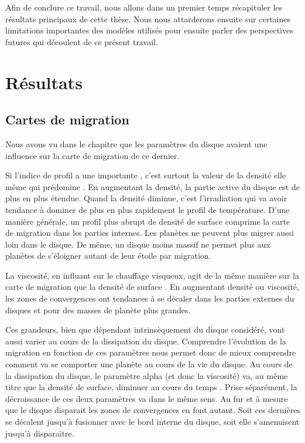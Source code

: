 Afin de conclure ce travail, nous allons dans un premier temps récapituler les résultats principaux de cette thèse. Nous nous attarderons ensuite sur certaines limitations importantes des modèles utilisés pour ensuite parler des perspectives futures qui découlent de ce présent travail. 

\section{Résultats}
\subsection{Cartes de migration}
Nous avons vu dans le chapitre  que les paramètres du disque avaient une influence sur la carte de migration de ce dernier. 

Si l'indice de profil a une importante , c'est surtout la valeur de la densité elle même qui prédomine . En augmentant la densité, la partie active du disque est de plus en plus étendue. Quand la densité diminue, c'est l'irradiation qui va avoir tendance à dominer de plus en plus rapidement le profil de température. D'une manière générale, un profil plus abrupt de densité de surface comprime la carte de migration dans les parties internes. Les planètes ne peuvent plus migrer aussi loin dans le disque. De même, un disque moins massif ne permet plus aux planètes de s'éloigner autant de leur étoile par migration. 

La viscosité, en influant sur le chauffage visqueux, agit de la même manière sur la carte de migration que la densité de surface . En augmentant densité ou viscosité, les zones de convergences ont tendances à se décaler dans les parties externes du disques et pour des masses de planète plus grandes. 

Ces grandeurs, bien que dépendant intrinsèquement du disque considéré, vont aussi varier au cours de la dissipation du disque. Comprendre l'évolution de la migration en fonction de ces paramètres nous permet donc de mieux comprendre comment va se comporter une planète au cours de la vie du disque. Au cours de la dissipation du disque, le paramètre alpha (et donc la viscosité) va, au même titre que la densité de surface, diminuer au cours du temps \citep[Fig. 16]{guilloteau2011dual}. Prise séparément, la décroissance de ces deux paramètres va dans le même sens. Au fur et à mesure que le disque disparait les zones de convergences en font autant. Soit ces dernières se décalent jusqu'à fusionner avec le bord interne du disque, soit elle s'amenuisent jusqu'à disparaitre.

